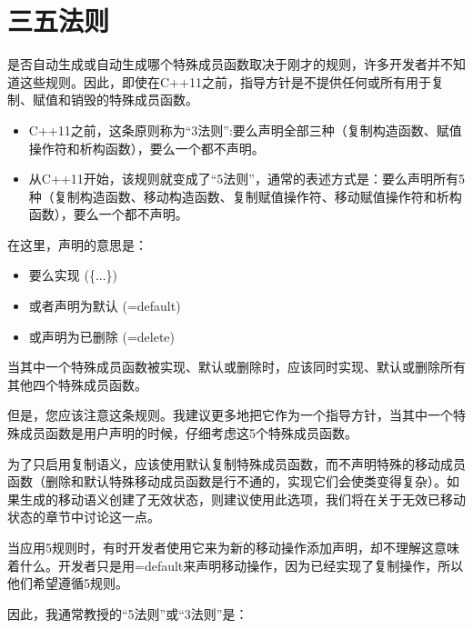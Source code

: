 \section{三五法则}
是否自动生成或自动生成哪个特殊成员函数取决于刚才的规则，许多开发者并不知道这些规则。因此，即使在C++11之前，指导方针是不提供任何或所有用于复制、赋值和销毁的特殊成员函数。

\begin{itemize}
	\item C++11之前，这条原则称为“3法则”:要么声明全部三种（复制构造函数、赋值操作符和析构函数），要么一个都不声明。
	\item 从C++11开始，该规则就变成了“5法则”，通常的表述方式是：要么声明所有5种（复制构造函数、移动构造函数、复制赋值操作符、移动赋值操作符和析构函数），要么一个都不声明。
\end{itemize}

在这里，声明的意思是：

\begin{itemize}
	\item 要么实现 (\{...\})
	\item 或者声明为默认 (=default)
	\item 或声明为已删除 (=delete)
\end{itemize}

当其中一个特殊成员函数被实现、默认或删除时，应该同时实现、默认或删除所有其他四个特殊成员函数。

但是，您应该注意这条规则。我建议更多地把它作为一个指导方针，当其中一个特殊成员函数是用户声明的时候，仔细考虑这5个特殊成员函数。

为了只启用复制语义，应该使用默认复制特殊成员函数，而不声明特殊的移动成员函数（删除和默认特殊移动成员函数是行不通的，实现它们会使类变得复杂）。如果生成的移动语义创建了无效状态，则建议使用此选项，我们将在关于无效已移动状态的章节中讨论这一点。

当应用5规则时，有时开发者使用它来为新的移动操作添加声明，却不理解这意味着什么。开发者只是用=default来声明移动操作，因为已经实现了复制操作，所以他们希望遵循5规则。

因此，我通常教授的“5法则”或“3法则”是：

